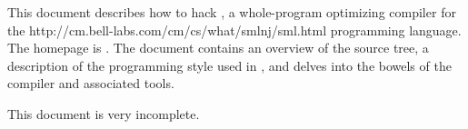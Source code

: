 This document describes how to hack {\mlton}, a
whole-program optimizing compiler for the
                  {http://cm.bell-labs.com/cm/cs/what/smlnj/sml.html}
programming language.
The {\mlton} homepage is \absolutelink{}.
The document contains an overview of the source tree, a description of the
programming style used in {\mlton}, and delves into the bowels of the compiler
and associated tools.

This document is very incomplete.  
